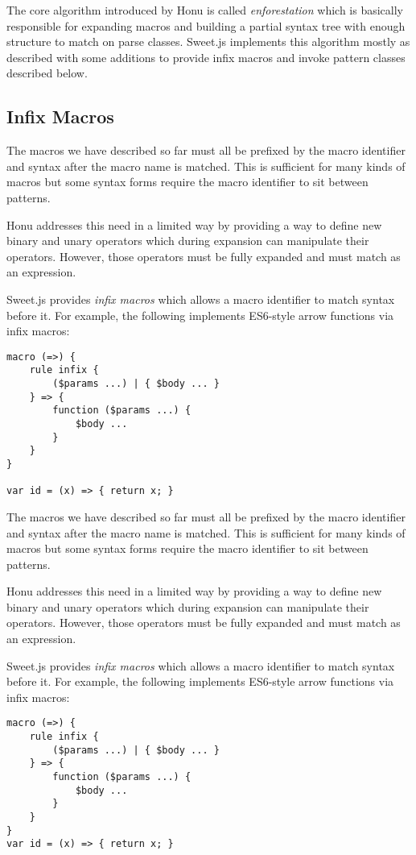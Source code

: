 \documentclass[preprint,10pt]{sigplanconf}
\begin{document}
The core algorithm introduced by Honu is called \emph{enforestation} which
is basically responsible for expanding macros and building a partial
syntax tree with enough structure to match on parse classes. Sweet.js
implements this algorithm mostly as described with some additions to
provide infix macros and invoke pattern classes described below.

\subsection{Infix Macros}
\label{sec-4-1}
The macros we have described so far must all be prefixed by the macro
identifier and syntax after the macro name is matched. This is
sufficient for many kinds of macros but some syntax forms require the
macro identifier to sit between patterns.

Honu addresses this need in a limited way by providing a way to define
new binary and unary operators which during expansion can manipulate
their operators. However, those operators must be fully expanded and
must match as an expression.

Sweet.js provides \emph{infix macros} which allows a macro identifier to
match syntax before it. For example, the following implements
ES6-style arrow functions via infix macros:

\begin{verbatim}
macro (=>) {
    rule infix {
        ($params ...) | { $body ... }
    } => {
        function ($params ...) {
            $body ...
        }
    }
}

var id = (x) => { return x; }
\end{verbatim}

The macros we have described so far must all be prefixed by the macro
identifier and syntax after the macro name is matched. This is
sufficient for many kinds of macros but some syntax forms require the
macro identifier to sit between patterns.

Honu addresses this need in a limited way by providing a way to define
new binary and unary operators which during expansion can manipulate
their operators. However, those operators must be fully expanded and
must match as an expression.

Sweet.js provides \emph{infix macros} which allows a macro identifier to
match syntax before it. For example, the following implements
ES6-style arrow functions via infix macros:

\begin{verbatim}
macro (=>) {
    rule infix {
        ($params ...) | { $body ... }
    } => {
        function ($params ...) {
            $body ...
        }
    }
}
var id = (x) => { return x; }
\end{verbatim}
\end{document}
